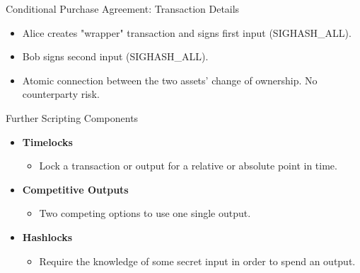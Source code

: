 \documentclass[handout]{beamer}
\begin{document}
\begin{frame}{Conditional Purchase Agreement: Transaction Details}
\begin{figure}
	\end{figure}
	\begin{itemize}
		\item<1 ->Alice creates "wrapper" transaction and signs first input  (SIGHASH\_ALL).
		\item<3 ->Bob signs second input (SIGHASH\_ALL).
		\item<4 ->Atomic connection between the two assets' change of ownership. No counterparty risk.
	\end{itemize}
\end{frame}


\begin{frame}{Further Scripting Components}
	\begin{itemize}
		\item<1-> \textbf{Timelocks}
		\begin{itemize}
			\item<1-> Lock a transaction or output for a relative or absolute point in time.
		\end{itemize}
		\vspace{0.25cm}
		\item<2-> \textbf{Competitive Outputs}
		\begin{itemize}
			\item<2-> Two competing options to use one single output.
		\end{itemize}
		\vspace{0.25cm}
		\item<3-> \textbf{Hashlocks}
		\begin{itemize}
			\item<3-> Require the knowledge of some secret input in order to spend an output.
		\end{itemize}
	\end{itemize}
\end{frame}

\end{document}
